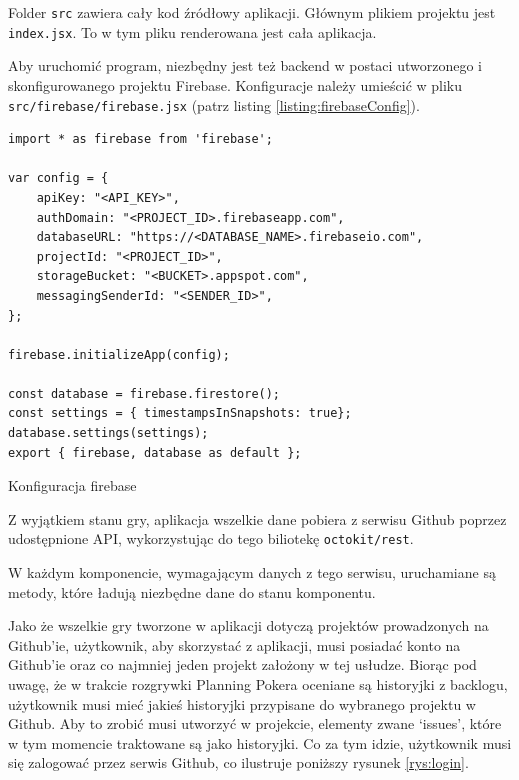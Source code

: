Folder \texttt{src} zawiera cały kod źródłowy aplikacji.
Głównym plikiem projektu jest \texttt{index.jsx}. To w tym pliku renderowana jest cała aplikacja.

Aby uruchomić program, niezbędny jest też backend w postaci utworzonego
i skonfigurowanego projektu Firebase.
Konfiguracje należy umieścić w pliku \texttt{src/firebase/firebase.jsx}
(patrz listing \ref{listing:firebaseConfig}).

\begin{listing}
\begin{verbatim}
import * as firebase from 'firebase';

var config = {
    apiKey: "<API_KEY>",
    authDomain: "<PROJECT_ID>.firebaseapp.com",
    databaseURL: "https://<DATABASE_NAME>.firebaseio.com",
    projectId: "<PROJECT_ID>",
    storageBucket: "<BUCKET>.appspot.com",
    messagingSenderId: "<SENDER_ID>",
};

firebase.initializeApp(config);

const database = firebase.firestore();
const settings = { timestampsInSnapshots: true};
database.settings(settings);
export { firebase, database as default };
\end{verbatim}
\caption{Konfiguracja firebase} \label{listing:firebaseConfig}
\end{listing}

Z wyjątkiem stanu gry, aplikacja wszelkie dane pobiera z serwisu Github poprzez
udostępnione API, wykorzystując do tego biliotekę \texttt{octokit/rest}.

W każdym komponencie, wymagającym danych z tego serwisu,
uruchamiane są metody, które ładują niezbędne dane do stanu komponentu.

Jako że wszelkie gry tworzone w aplikacji dotyczą projektów prowadzonych na Github'ie,
użytkownik, aby skorzystać z aplikacji, musi posiadać konto na Github'ie oraz co najmniej
jeden projekt założony w tej usłudze.
Biorąc pod uwagę, że w trakcie rozgrywki Planning Pokera oceniane są historyjki z backlogu,
użytkownik musi mieć jakieś historyjki przypisane do wybranego projektu w Github.
Aby to zrobić musi utworzyć w projekcie, elementy zwane `issues', które w tym momencie traktowane są jako historyjki.
Co za tym idzie, użytkownik musi się zalogować przez serwis Github, co ilustruje poniższy rysunek \ref{rys:login}.

